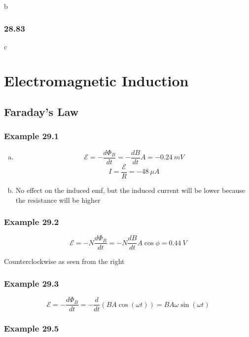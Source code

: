 \documentclass{article}
\begin{document}
b

\subsubsection{28.83}

c

\section{Electromagnetic Induction}

\setcounter{subsection}{1}
\subsection{Faraday's Law}

\subsubsection{Example 29.1}

\begin{enumerate}[(a)]
  \item \[\mathcal{E} = -\frac{d \Phi_B}{dt} = -\frac{dB}{dt} A = \qty{-0.24}{mV}\] \[I = \frac{\mathcal{E}}{R} = \qty{-48}{\mu A}\]

  \item No effect on the induced emf, but the induced current will be lower because the resistance will be higher
\end{enumerate}

\subsubsection{Example 29.2}

\[\mathcal{E} = -N \frac{d \Phi_B}{dt} = -N \frac{dB}{dt} A \cos \phi = \qty{0.44}{V}\]

Counterclockwise as seen from the right

\subsubsection{Example 29.3}

\[\mathcal{E} = -\frac{d \Phi_B}{dt} = -\frac{d}{dt} (B A \cos (\omega t)) = B A \omega \sin (\omega t)\]

\subsubsection{Example 29.5}
\end{document}
